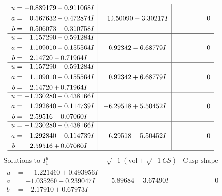 \documentclass[1p]{elsarticle_modified}
\theoremstyle{definition}
\newcommand{\I}{\sqrt{-1}}
\begin{document}
$$\begin{array}{c|c|c}
\begin{aligned}
u &= -0.889179 - 0.911068 I \\
a &= \phantom{-}0.567632 - 0.472874 I \\
b &= \phantom{-}0.506073 - 0.310758 I\end{aligned}
 & \phantom{-}10.50090 - 3.30217 I & \phantom{-0.000000 } 0 \\ \hline\begin{aligned}
u &= \phantom{-}1.157290 + 0.591284 I \\
a &= \phantom{-}1.109010 - 0.155564 I \\
b &= \phantom{-}2.14720 - 0.71964 I\end{aligned}
 & \phantom{-}0.92342 - 6.68779 I & \phantom{-0.000000 } 0 \\ \hline\begin{aligned}
u &= \phantom{-}1.157290 - 0.591284 I \\
a &= \phantom{-}1.109010 + 0.155564 I \\
b &= \phantom{-}2.14720 + 0.71964 I\end{aligned}
 & \phantom{-}0.92342 + 6.68779 I & \phantom{-0.000000 } 0 \\ \hline\begin{aligned}
u &= -1.230280 + 0.438166 I \\
a &= \phantom{-}1.292840 + 0.114739 I \\
b &= \phantom{-}2.59516 - 0.07060 I\end{aligned}
 & -6.29518 + 5.50452 I & \phantom{-0.000000 } 0 \\ \hline\begin{aligned}
u &= -1.230280 - 0.438166 I \\
a &= \phantom{-}1.292840 - 0.114739 I \\
b &= \phantom{-}2.59516 + 0.07060 I\end{aligned}
 & -6.29518 - 5.50452 I & \phantom{-0.000000 } 0\\
 \hline 
 \end{array}$$\newpage$$\begin{array}{c|c|c}  
\text{Solutions to }I^u_{1}& \I (\text{vol} + \sqrt{-1}CS) & \text{Cusp shape}\\
 \hline 
\begin{aligned}
u &= \phantom{-}1.221460 + 0.493956 I \\
a &= -1.035260 + 0.239047 I \\
b &= -2.17910 + 0.67973 I\end{aligned}
 & -5.89684 - 3.67490 I & \phantom{-0.000000 } 0 \\ \hline\begin{aligned}

\end{aligned}
\end{array}$$
\end{document}
